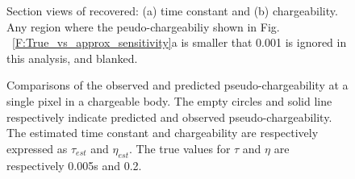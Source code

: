 \documentclass[extra,mreferee]{gji}
\begin{document}
\begin{figure}
  \caption{Section views of recovered: (a) time constant and (b) chargeability. Any region where the peudo-chargeabiliy shown in Fig. ~\ref{F:True_vs_approx_sensitivity}a is smaller that 0.001 is ignored in this analysis, and blanked.}
  \label{F:EtaTauSection}
\end{figure}

\begin{figure}
  \caption{Comparisons of the observed and predicted pseudo-chargeability at a single pixel in a chargeable body.
  The empty circles and solid line respectively indicate predicted and observed pseudo-chargeability. The estimated time constant and chargeability are respectively expressed as $\tau_{est}$ and $\eta_{est}$. The true values for $\tau$ and $\eta$ are respectively 0.005s and 0.2.}
  \label{F:IntrinsicIP}
\end{figure}

\clearpage
\end{document}
